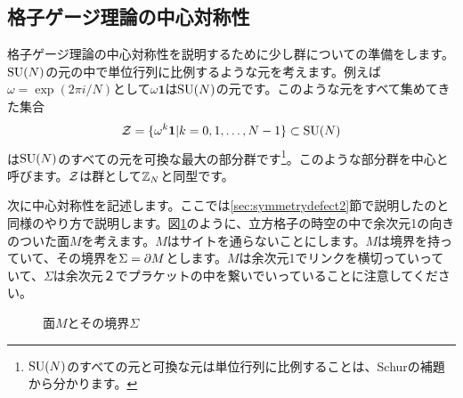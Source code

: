 \documentclass[generalized_symmetry.tex]{subfiles}
\begin{document}
\subsection{格子ゲージ理論の中心対称性}

格子ゲージ理論の中心対称性を説明するために少し群についての準備をします。$\mbox{SU}(N)$の元の中で単位行列に比例するような元を考えます。例えば$\omega=\exp(2\pi i/N)$として$\omega \mathbf{1}$は$\mbox{SU}(N)$の元です。このような元をすべて集めてきた集合
\begin{align}
    \mathcal{Z} = \{ \omega^k \mathbf{1} | k=0,1,\dots,N-1 \}\subset \mbox{SU}(N)
\end{align}
は$\mbox{SU}(N)$のすべての元を可換な最大の部分群です\footnote{$\mbox{SU}(N)$のすべての元と可換な元は単位行列に比例することは、Schurの補題から分かります。}。このような部分群を中心と呼びます。$\mathcal{Z}$は群として$\mathbb{Z}_N$と同型です。

次に中心対称性を記述します。ここでは\ref{sec:symmetrydefect2}節で説明したのと同様のやり方で説明します。図\ref{fig:faceboundary}のように、立方格子の時空の中で余次元1の向きのついた面$M$を考えます。$M$はサイトを通らないことにします。$M$は境界を持っていて、その境界を$\Sigma=\partial M$とします。$M$は余次元1でリンクを横切っていっていて、$\Sigma$は余次元２でプラケットの中を繋いでいっていることに注意してください。

\begin{figure}[htbp]
    \centering
    \caption{面$M$とその境界$\Sigma$}
    \label{fig:faceboundary}
\end{figure}
\end{document}
